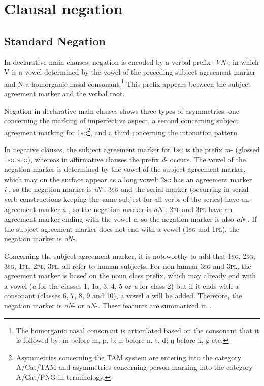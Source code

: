 \documentclass[output=paper,colorlinks,citecolor=brown]{langscibook}
\begin{document}
\section{Clausal negation}\label{sec:mank:2}
\subsection{Standard Negation}\label{sec:mank:2.1}

In declarative main clauses, negation is encoded by a verbal prefix {}-\textit{VN}{}-, in which V is a vowel determined by the vowel of the preceding subject agreement marker and N a homorganic nasal consonant.\footnote{The homorganic nasal consonant is articulated based on the consonant that it is followed by: m before m, p, b; n before n, t, d; ŋ before k, g etc.} This prefix appears between the subject agreement marker and the verbal root. 

Negation in declarative main clauses shows three types of asymmetries: one concerning the marking of imperfective aspect, a second concerning subject agreement marking for \textsc{1sg}\footnote{Asymmetries concerning the TAM system are entering into the category A/Cat/TAM and asymmetries concerning person marking into the category A/Cat/PNG in  terminology.}, and a third concerning the intonation pattern.

In negative clauses, the subject agreement marker for \textsc{1sg} is the prefix \textit{m}{}- (glossed \textsc{1sg.neg}), whereas in affirmative clauses the prefix \textit{d}{}- occurs. The vowel of the negation marker is determined by the vowel of the subject agreement marker, which may on the surface appear as a long vowel: \textsc{2sg} has an agreement marker \textit{i}{}-, so the negation marker is \textit{iN}{}-; \textsc{3sg} and the serial marker (occurring in serial verb constructions keeping the same subject for all verbs of the series) have an agreement marker \textit{a}{}-, so the negation marker is \textit{aN}{}-. \textsc{2pl} and \textsc{3pl} have an agreement marker ending with the vowel \textit{a}, so the negation marker is also \textit{aN}{}-. If the subject agreement marker does not end with a vowel (\textsc{1sg} and \textsc{1pl}), the negation marker is \textit{əN}{}-.

Concerning the subject agreement marker, it is noteworthy to add that \textsc{1sg}, \textsc{2sg}, \textsc{3sg}, \textsc{1pl}, \textsc{2pl}, \textsc{3pl}, all refer to human subjects. For non-human \textsc{3sg} and \textsc{3pl}, the agreement marker is based on the noun class prefix, which may already end with a vowel (\textit{a} for the classes 1, 1a, 3, 4, 5 or \textit{u} for class 2) but if it ends with a consonant (classes 6, 7, 8, 9 and 10), a vowel \textit{a} will be added. Therefore, the negation marker is \textit{aN}{}- or \textit{uN}{}-.  These features are summarized in .
\end{document}
